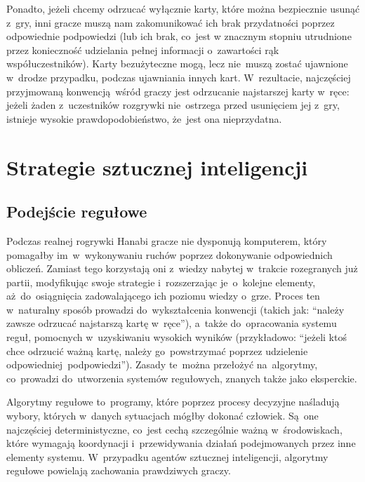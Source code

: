 \documentclass[declaration,shortabstract,inz]{iithesis}
\begin{document}
Ponadto, jeżeli chcemy odrzucać wyłącznie karty, które można bezpiecznie usunąć z~gry, inni gracze muszą nam zakomunikować ich brak przydatności poprzez odpowiednie podpowiedzi (lub ich brak, co~jest w znacznym stopniu utrudnione przez konieczność udzielania pełnej informacji o~zawartości rąk współuczestników). Karty bezużyteczne mogą, lecz nie~muszą zostać ujawnione w~drodze przypadku, podczas ujawniania innych kart. W~rezultacie, najczęściej przyjmowaną konwencją wśród graczy jest odrzucanie najstarszej karty w~ręce: jeżeli żaden z~uczestników rozgrywki nie~ostrzega przed usunięciem jej z~gry, istnieje wysokie prawdopodobieństwo, że~jest ona nieprzydatna.

\chapter{Strategie sztucznej inteligencji}

\section{Podejście regułowe}

Podczas realnej rogrywki Hanabi gracze nie dysponują komputerem, który pomagałby im~w~wykonywaniu ruchów poprzez dokonywanie odpowiednich obliczeń. Zamiast tego korzystają oni z~wiedzy nabytej w~trakcie rozegranych już partii, modyfikując swoje strategie i~rozszerzając je~o~kolejne elementy, aż~do~osiągnięcia zadowalającego ich poziomu wiedzy o~grze. Proces ten w~naturalny sposób prowadzi do~wykształcenia konwencji (takich jak: ``należy zawsze odrzucać najstarszą kartę w~ręce''), a~także do~opracowania systemu reguł, pomocnych w~uzyskiwaniu wysokich wyników (przykładowo: ``jeżeli ktoś chce odrzucić ważną kartę, należy go~powstrzymać poprzez udzielenie odpowiedniej podpowiedzi''). Zasady te~można przełożyć na~algorytmy, co~prowadzi do~utworzenia systemów regułowych, znanych także jako eksperckie.

Algorytmy regułowe to~programy, które poprzez procesy decyzyjne naśladują wybory, których w~danych sytuacjach mógłby dokonać człowiek. Są~one najczęściej deterministyczne, co~jest cechą szczególnie ważną w~środowiskach, które wymagają koordynacji i~przewidywania działań podejmowanych przez inne elementy systemu. W~przypadku agentów sztucznej inteligencji, algorytmy regułowe powielają zachowania prawdziwych graczy.
\end{document}
